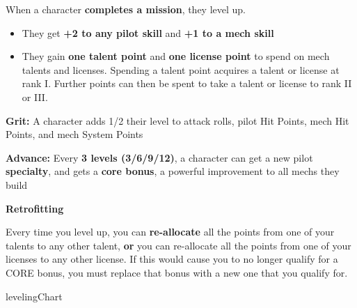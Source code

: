 When a character \textbf{completes a mission}, they level up.
\begin{itemize}
\item They get \textbf{+2 to any pilot skill} and \textbf{+1 to a mech skill}
\item They gain \textbf{one talent point} and \textbf{one license point} to spend on mech talents and
      licenses. Spending a talent point acquires a talent or license at rank I. Further
      points can then be spent to take a talent or license to rank II or III.
\end{itemize}


\textbf{Grit:} A character adds 1/2 their level to attack rolls, pilot Hit Points, mech Hit Points, and mech
System Points

\textbf{Advance:} Every \textbf{3 levels (3/6/9/12)}, a character can get a new
pilot \textbf{specialty}, and gets a \textbf{core bonus}, a powerful improvement to all mechs they build

\begin{center}
\textbf{Retrofitting}
\end{center}

Every time you level up, you can \textbf{re-allocate} all the points from one of your talents to any other
talent, \textbf{or} you can re-allocate all the points from one of your licenses to any other license. If this
would cause you to no longer qualify for a CORE bonus, you must replace that bonus with a new
one that you qualify for.

{levelingChart}
